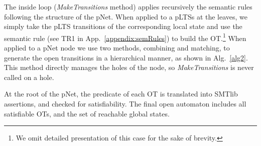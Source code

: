 \documentclass{lncs/llncs}
\newcommand{\noteSB}[2][color=green!40, size=\tiny]{\todo[#1]{{\bf
      Note: } {#2}}}
\newcommand{\noteEM}[2][color=blue!40, size=\tiny]{\todo[#1]{{\bf Eric: } {#2}}}
\newcommand{\noteInSB}[2][inline,color=green!40]{\todo[#1]{{\bf Simon: } {#2}}}
\newcommand{\mdash}{---}
\begin{document}
The inside loop (\emph{MakeTransitions} method) applies recursively
the semantic rules following the structure of the pNet.
When applied to a pLTSs at the leaves, we simply take the pLTS transitions of the
corresponding local state and use the semantic rule (see TR1 in
App.~\ref{appendix:semRules}) to build the OT.\footnote{%
%
  We omit detailed presentation of this case for the sake of brevity.
%
}
When applied to a pNet node we use two methods, combining and
matching, to generate the open transitions in a hierarchical manner,
as shown in Alg.~\ref{alg2}. This method directly manages the
holes of the node, so \emph{MakeTransitions} is never called on a hole.

At the root of the pNet, the predicate of each OT is translated
into SMTlib assertions, and checked for satisfiability.
%
The final open automaton includes all satisfiable OTs, and the set of
reachable global states.  

%

%



\end{document}
